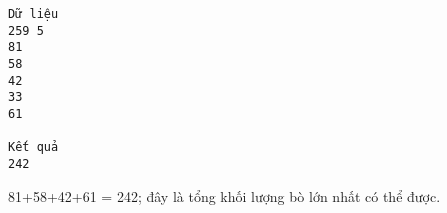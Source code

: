 \begin{verbatim}
Dữ liệu
259 5
81
58
42
33
61

Kết quả
242
\end{verbatim}
81+58+42+61 = 242; đây là tổng khối lượng bò lớn nhất có thể được.